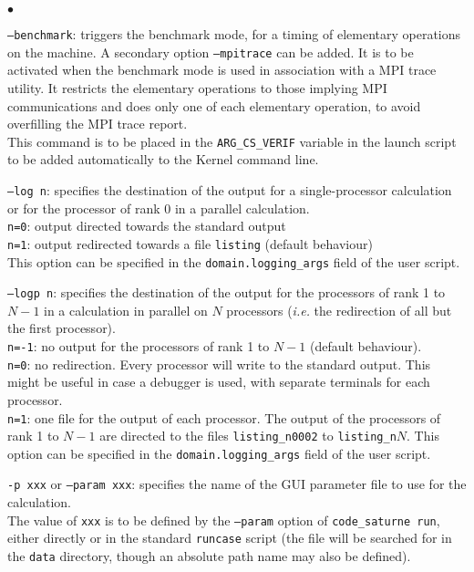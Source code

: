 {{{\begin{list}{$\bullet$}{}
\item \texttt{--benchmark}: triggers the benchmark mode, for a timing
of elementary operations on the machine. A secondary option
\texttt{--mpitrace} can be added. It is to be activated when the benchmark mode
is used in association with a MPI trace utility. It restricts the elementary
operations to those implying MPI communications and does only one of each
elementary operation, to avoid overfilling the MPI trace report.\\
This command is to be placed in the \texttt{ARG\_CS\_VERIF} variable
in the launch script to be added automatically to the Kernel command line.

\item \texttt{--log n}: specifies the destination of the output for a
single-processor calculation or for the processor of rank 0 in a parallel
calculation.\\
\hspace*{0.5cm}\texttt{n=0}: output directed towards the standard output\\
\hspace*{0.5cm}\texttt{n=1}: output redirected towards a file \texttt{listing}
(default behaviour)\\
This option can be specified in the \texttt{domain.logging\_args} field
of the user script.

\item \texttt{--logp n}: specifies the destination of the output for the
processors of rank 1 to $N-1$ in a calculation in parallel on $N$ processors
({\em i.e.} the redirection of all but the first processor).\\
\hspace*{0.5cm}\texttt{n=-1}: no output for the processors of rank 1 to $N-1$
(default behaviour).\\
\hspace*{0.5cm}\texttt{n=0}: no redirection. Every processor will write to the
standard output. This might be useful in case a debugger is used, with separate
terminals for each processor.\\
\hspace*{0.5cm}\texttt{n=1}: one file for the output of each processor. The
output of the processors of rank 1 to $N-1$ are directed to the files
\texttt{listing\_n0002} to \texttt{listing\_n$N$}.
This option can be specified in the \texttt{domain.logging\_args} field
of the user script.

\item \texttt{-p xxx} or \texttt{--param xxx}: specifies the name of the GUI
parameter file to use for the calculation.\\
The value of \texttt{xxx} is to be defined by the \texttt{--param} option
of \texttt{code\_saturne run}, either directly or in the standard \texttt{runcase}
script (the file will be searched for in the \texttt{data} directory, though
an absolute path name may also be defined).


\end{list}}}}
